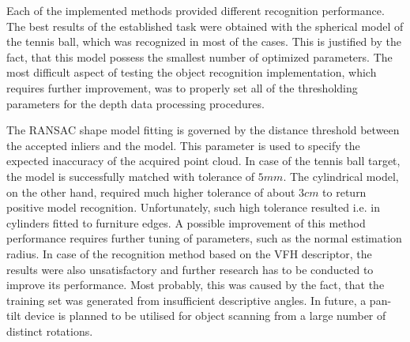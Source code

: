 Each of the implemented methods provided different recognition performance. The best results of the established task were obtained with the spherical model of the tennis ball, which was recognized in most of the cases. This is justified by the fact, that this model possess the smallest number of optimized parameters. The most difficult aspect of testing the object recognition implementation, which requires further improvement, was to properly set all of the thresholding parameters for the depth data processing procedures. 

The RANSAC shape model fitting is governed by the distance threshold between the accepted inliers and the model. This parameter is used to specify the expected inaccuracy of the acquired point cloud.  In case of the tennis ball target, the model is successfully matched with tolerance of $5mm$. The cylindrical model, on the other hand, required much higher tolerance of about $3cm$ to return positive model recognition. Unfortunately, such high tolerance resulted i.e. in cylinders fitted to furniture edges. A possible improvement of this method performance requires further tuning of parameters, such as the normal estimation radius. In case of the recognition method based on the VFH descriptor, the results were also unsatisfactory and further research has to be conducted to improve its performance. Most probably, this was caused by the fact, that the training set was generated from insufficient descriptive angles. In future, a pan-tilt device is planned to be utilised for object scanning from a large number of distinct rotations.